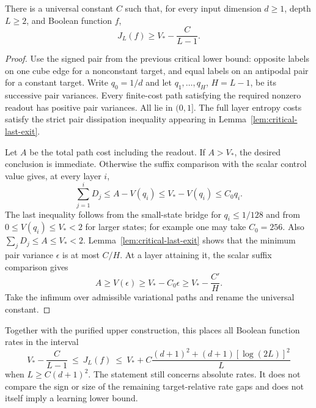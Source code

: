 \begin{theorem}
\label{thm:critical-sharp-lower}
There is a universal constant $C$ such that, for every input dimension
$d\ge1$, depth $L\ge2$, and Boolean function $f$,
\[
 J_L(f)\ge V_*-\frac{C}{L-1}.
\]
\end{theorem}

\begin{proof}
Use the signed pair from the previous critical lower bound: opposite
labels on one cube edge for a nonconstant target, and equal labels on
an antipodal pair for a constant target. Write $q_0=1/d$ and let
$q_1,\ldots,q_H$, $H=L-1$, be its successive pair variances.
Every finite-cost path satisfying the required nonzero readout has
positive pair variances. All lie in $(0,1]$.
The full layer entropy costs satisfy the strict pair dissipation
inequality appearing in Lemma~\ref{lem:critical-last-exit}.

Let $A$ be the total path cost including the readout. If $A>V_*$,
the desired conclusion is immediate. Otherwise the suffix comparison
with the scalar control value gives, at every layer $i$,
\[
 \sum_{j=1}^{i}D_j\le A-V(q_i)
 \le V_*-V(q_i)\le C_0q_i.
\]
The last inequality follows from the small-state bridge for
$q_i\le1/128$ and from $0\le V(q_i)\le V_*<2$ for larger states;
for example one may take $C_0=256$. Also
$\sum_jD_j\le A\le V_*<2$.
Lemma~\ref{lem:critical-last-exit} shows that the minimum pair variance
$\epsilon$ is at most $C/H$. At a layer attaining it, the scalar
suffix comparison gives
\[
 A\ge V(\epsilon)\ge V_*-C_0\epsilon\ge V_*-\frac{C'}H.
\]
Take the infimum over admissible variational paths and rename the
universal constant.
\end{proof}

Together with the purified upper construction, this places all Boolean
function rates in the interval
\[
 V_*-\frac{C}{L-1}
 \ \le\ J_L(f)\ \le\
 V_*+C\frac{(d+1)^2+(d+1)[\log(2L)]^2}{L}
\]
when $L\ge C(d+1)^2$. The statement still concerns absolute rates.
It does not compare the sign or size of the remaining target-relative
rate gaps and does not itself imply a learning lower bound.

